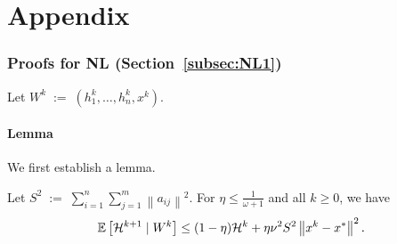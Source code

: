 \documentclass[12pt]{article}
\newcommand{\eqdef}{\; { := }\;}
\newcommand{\ExpBr}[1]{\mathbb{E}\left[#1\right]}
\newcommand{\norm}[1]{\left\|#1\right\|}
\begin{document}
\part*{Appendix}



\section{Proofs for {\sf NL} (Section~\ref{subsec:NL1})}


Let $W^k \eqdef (h_1^k, \dots, h_n^k, x^k)$.


\subsection{Lemma}

We first establish a lemma.

\begin{lemma}\label{lm:calHk} Let $S^2\eqdef \sum_{i=1}^n \sum_{j=1}^m \norm{a_{ij}}^2$. For $\eta \leq \frac{1}{\omega+1}$ and all $k\geq 0$, we have 
$$
\ExpBr{ {\cal H}^{k+1} \;|\; W^k} \leq  (1-\eta) {\cal H}^k +  \eta \nu^2 S^2 \norm{x^k - x^*}^2.
$$
\end{lemma}
\end{document}
